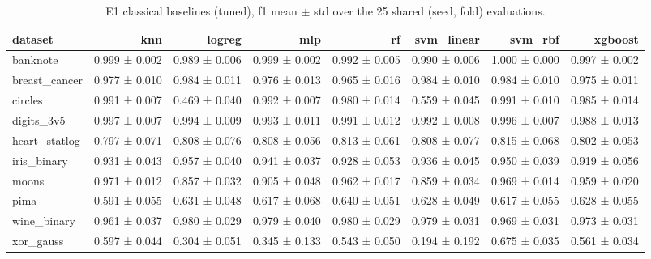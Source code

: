 \begin{table}[ht]
\centering
\caption{E1 classical baselines (tuned), f1 mean $\pm$ std over the 25 shared (seed, fold) evaluations.}
\label{tab:e1-tuned-f1}
\begin{tabular}{lrrrrrrr}
\toprule
dataset & knn & logreg & mlp & rf & svm\_linear & svm\_rbf & xgboost \\
\midrule
banknote & 0.999 ± 0.002 & 0.989 ± 0.006 & 0.999 ± 0.002 & 0.992 ± 0.005 & 0.990 ± 0.006 & 1.000 ± 0.000 & 0.997 ± 0.002 \\
breast\_cancer & 0.977 ± 0.010 & 0.984 ± 0.011 & 0.976 ± 0.013 & 0.965 ± 0.016 & 0.984 ± 0.010 & 0.984 ± 0.010 & 0.975 ± 0.011 \\
circles & 0.991 ± 0.007 & 0.469 ± 0.040 & 0.992 ± 0.007 & 0.980 ± 0.014 & 0.559 ± 0.045 & 0.991 ± 0.010 & 0.985 ± 0.014 \\
digits\_3v5 & 0.997 ± 0.007 & 0.994 ± 0.009 & 0.993 ± 0.011 & 0.991 ± 0.012 & 0.992 ± 0.008 & 0.996 ± 0.007 & 0.988 ± 0.013 \\
heart\_statlog & 0.797 ± 0.071 & 0.808 ± 0.076 & 0.808 ± 0.056 & 0.813 ± 0.061 & 0.808 ± 0.077 & 0.815 ± 0.068 & 0.802 ± 0.053 \\
iris\_binary & 0.931 ± 0.043 & 0.957 ± 0.040 & 0.941 ± 0.037 & 0.928 ± 0.053 & 0.936 ± 0.045 & 0.950 ± 0.039 & 0.919 ± 0.056 \\
moons & 0.971 ± 0.012 & 0.857 ± 0.032 & 0.905 ± 0.048 & 0.962 ± 0.017 & 0.859 ± 0.034 & 0.969 ± 0.014 & 0.959 ± 0.020 \\
pima & 0.591 ± 0.055 & 0.631 ± 0.048 & 0.617 ± 0.068 & 0.640 ± 0.051 & 0.628 ± 0.049 & 0.617 ± 0.055 & 0.628 ± 0.055 \\
wine\_binary & 0.961 ± 0.037 & 0.980 ± 0.029 & 0.979 ± 0.040 & 0.980 ± 0.029 & 0.979 ± 0.031 & 0.969 ± 0.031 & 0.973 ± 0.031 \\
xor\_gauss & 0.597 ± 0.044 & 0.304 ± 0.051 & 0.345 ± 0.133 & 0.543 ± 0.050 & 0.194 ± 0.192 & 0.675 ± 0.035 & 0.561 ± 0.034 \\
\bottomrule
\end{tabular}
\end{table}
